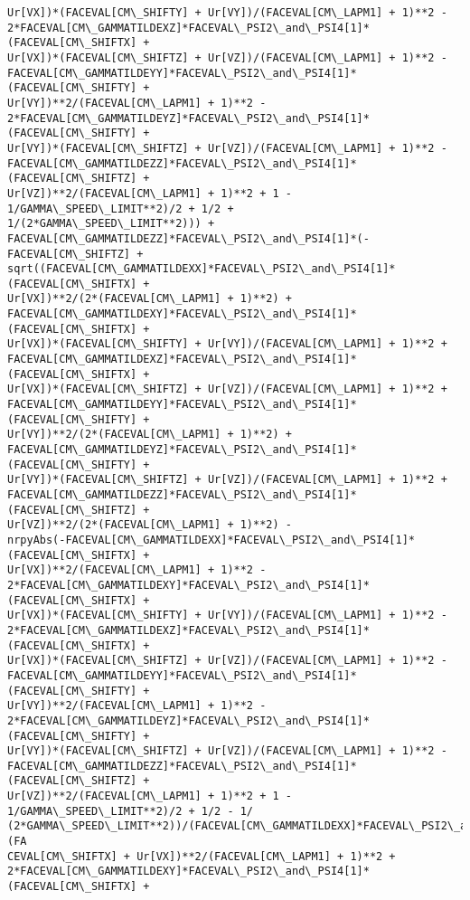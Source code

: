 \documentclass[landscape,letterpaper,10pt,english]{article}
\begin{document}
\begin{Verbatim}[commandchars=\\\{\}]
Ur[VX])*(FACEVAL[CM\_SHIFTY] + Ur[VY])/(FACEVAL[CM\_LAPM1] + 1)**2 -
2*FACEVAL[CM\_GAMMATILDEXZ]*FACEVAL\_PSI2\_and\_PSI4[1]*(FACEVAL[CM\_SHIFTX] +
Ur[VX])*(FACEVAL[CM\_SHIFTZ] + Ur[VZ])/(FACEVAL[CM\_LAPM1] + 1)**2 -
FACEVAL[CM\_GAMMATILDEYY]*FACEVAL\_PSI2\_and\_PSI4[1]*(FACEVAL[CM\_SHIFTY] +
Ur[VY])**2/(FACEVAL[CM\_LAPM1] + 1)**2 -
2*FACEVAL[CM\_GAMMATILDEYZ]*FACEVAL\_PSI2\_and\_PSI4[1]*(FACEVAL[CM\_SHIFTY] +
Ur[VY])*(FACEVAL[CM\_SHIFTZ] + Ur[VZ])/(FACEVAL[CM\_LAPM1] + 1)**2 -
FACEVAL[CM\_GAMMATILDEZZ]*FACEVAL\_PSI2\_and\_PSI4[1]*(FACEVAL[CM\_SHIFTZ] +
Ur[VZ])**2/(FACEVAL[CM\_LAPM1] + 1)**2 + 1 - 1/GAMMA\_SPEED\_LIMIT**2)/2 + 1/2 +
1/(2*GAMMA\_SPEED\_LIMIT**2))) +
FACEVAL[CM\_GAMMATILDEZZ]*FACEVAL\_PSI2\_and\_PSI4[1]*(-FACEVAL[CM\_SHIFTZ] +
sqrt((FACEVAL[CM\_GAMMATILDEXX]*FACEVAL\_PSI2\_and\_PSI4[1]*(FACEVAL[CM\_SHIFTX] +
Ur[VX])**2/(2*(FACEVAL[CM\_LAPM1] + 1)**2) +
FACEVAL[CM\_GAMMATILDEXY]*FACEVAL\_PSI2\_and\_PSI4[1]*(FACEVAL[CM\_SHIFTX] +
Ur[VX])*(FACEVAL[CM\_SHIFTY] + Ur[VY])/(FACEVAL[CM\_LAPM1] + 1)**2 +
FACEVAL[CM\_GAMMATILDEXZ]*FACEVAL\_PSI2\_and\_PSI4[1]*(FACEVAL[CM\_SHIFTX] +
Ur[VX])*(FACEVAL[CM\_SHIFTZ] + Ur[VZ])/(FACEVAL[CM\_LAPM1] + 1)**2 +
FACEVAL[CM\_GAMMATILDEYY]*FACEVAL\_PSI2\_and\_PSI4[1]*(FACEVAL[CM\_SHIFTY] +
Ur[VY])**2/(2*(FACEVAL[CM\_LAPM1] + 1)**2) +
FACEVAL[CM\_GAMMATILDEYZ]*FACEVAL\_PSI2\_and\_PSI4[1]*(FACEVAL[CM\_SHIFTY] +
Ur[VY])*(FACEVAL[CM\_SHIFTZ] + Ur[VZ])/(FACEVAL[CM\_LAPM1] + 1)**2 +
FACEVAL[CM\_GAMMATILDEZZ]*FACEVAL\_PSI2\_and\_PSI4[1]*(FACEVAL[CM\_SHIFTZ] +
Ur[VZ])**2/(2*(FACEVAL[CM\_LAPM1] + 1)**2) -
nrpyAbs(-FACEVAL[CM\_GAMMATILDEXX]*FACEVAL\_PSI2\_and\_PSI4[1]*(FACEVAL[CM\_SHIFTX] +
Ur[VX])**2/(FACEVAL[CM\_LAPM1] + 1)**2 -
2*FACEVAL[CM\_GAMMATILDEXY]*FACEVAL\_PSI2\_and\_PSI4[1]*(FACEVAL[CM\_SHIFTX] +
Ur[VX])*(FACEVAL[CM\_SHIFTY] + Ur[VY])/(FACEVAL[CM\_LAPM1] + 1)**2 -
2*FACEVAL[CM\_GAMMATILDEXZ]*FACEVAL\_PSI2\_and\_PSI4[1]*(FACEVAL[CM\_SHIFTX] +
Ur[VX])*(FACEVAL[CM\_SHIFTZ] + Ur[VZ])/(FACEVAL[CM\_LAPM1] + 1)**2 -
FACEVAL[CM\_GAMMATILDEYY]*FACEVAL\_PSI2\_and\_PSI4[1]*(FACEVAL[CM\_SHIFTY] +
Ur[VY])**2/(FACEVAL[CM\_LAPM1] + 1)**2 -
2*FACEVAL[CM\_GAMMATILDEYZ]*FACEVAL\_PSI2\_and\_PSI4[1]*(FACEVAL[CM\_SHIFTY] +
Ur[VY])*(FACEVAL[CM\_SHIFTZ] + Ur[VZ])/(FACEVAL[CM\_LAPM1] + 1)**2 -
FACEVAL[CM\_GAMMATILDEZZ]*FACEVAL\_PSI2\_and\_PSI4[1]*(FACEVAL[CM\_SHIFTZ] +
Ur[VZ])**2/(FACEVAL[CM\_LAPM1] + 1)**2 + 1 - 1/GAMMA\_SPEED\_LIMIT**2)/2 + 1/2 - 1/
(2*GAMMA\_SPEED\_LIMIT**2))/(FACEVAL[CM\_GAMMATILDEXX]*FACEVAL\_PSI2\_and\_PSI4[1]*(FA
CEVAL[CM\_SHIFTX] + Ur[VX])**2/(FACEVAL[CM\_LAPM1] + 1)**2 +
2*FACEVAL[CM\_GAMMATILDEXY]*FACEVAL\_PSI2\_and\_PSI4[1]*(FACEVAL[CM\_SHIFTX] +

\end{Verbatim}
\end{document}
